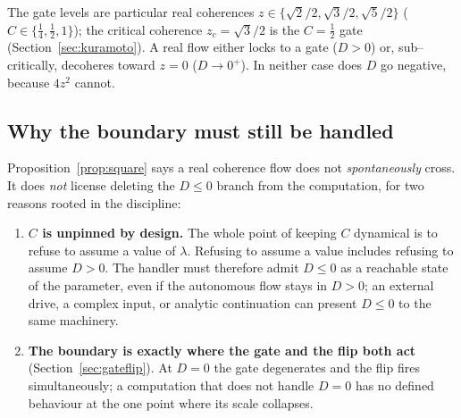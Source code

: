 \documentclass[11pt]{article}
\theoremstyle{plain}
\theoremstyle{definition}
\theoremstyle{remark}
\begin{document}
The gate levels are particular real coherences $z\in\{\sqrt2/2,\sqrt3/2,\sqrt5/2\}$ ($C\in\{\tfrac14,\tfrac12,1\}$); the critical coherence $z_c=\sqrt3/2$ is the $C=\tfrac12$ gate (Section~\ref{sec:kuramoto}). A real flow either locks to a gate ($D>0$) or, sub--critically, decoheres toward $z=0$ ($D\to0^+$). In neither case does $D$ go negative, because $4z^2$ cannot.

\subsection{Why the boundary must still be handled}

Proposition~\ref{prop:square} says a real coherence flow does not \emph{spontaneously} cross. It does \emph{not} license deleting the $D\le0$ branch from the computation, for two reasons rooted in the discipline:

\begin{enumerate}[leftmargin=1.6em,itemsep=3pt]
\item \textbf{$C$ is unpinned by design.} The whole point of keeping $C$ dynamical is to refuse to assume a value of $\lambda$. Refusing to assume a value includes refusing to assume $D>0$. The handler must therefore admit $D\le0$ as a reachable state of the parameter, even if the autonomous flow stays in $D>0$; an external drive, a complex input, or analytic continuation can present $D\le0$ to the same machinery.
\item \textbf{The boundary is exactly where the gate and the flip both act} (Section~\ref{sec:gateflip}). At $D=0$ the gate degenerates and the flip fires simultaneously; a computation that does not handle $D=0$ has no defined behaviour at the one point where its scale collapses.
\end{enumerate}
\end{document}
